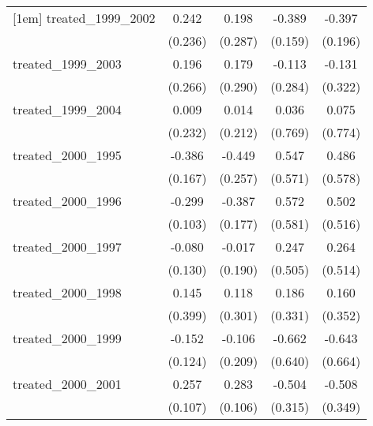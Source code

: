{\begin{tabular}{l*{4}{c}}
[1em]
treated\_1999\_2002&       0.242         &       0.198         &      -0.389\sym{*}  &      -0.397\sym{*}  \\
            &     (0.236)         &     (0.287)         &     (0.159)         &     (0.196)         \\
[1em]
treated\_1999\_2003&       0.196         &       0.179         &      -0.113         &      -0.131         \\
            &     (0.266)         &     (0.290)         &     (0.284)         &     (0.322)         \\
[1em]
treated\_1999\_2004&       0.009         &       0.014         &       0.036         &       0.075         \\
            &     (0.232)         &     (0.212)         &     (0.769)         &     (0.774)         \\
[1em]
treated\_2000\_1995&      -0.386\sym{*}  &      -0.449         &       0.547         &       0.486         \\
            &     (0.167)         &     (0.257)         &     (0.571)         &     (0.578)         \\
[1em]
treated\_2000\_1996&      -0.299\sym{**} &      -0.387\sym{*}  &       0.572         &       0.502         \\
            &     (0.103)         &     (0.177)         &     (0.581)         &     (0.516)         \\
[1em]
treated\_2000\_1997&      -0.080         &      -0.017         &       0.247         &       0.264         \\
            &     (0.130)         &     (0.190)         &     (0.505)         &     (0.514)         \\
[1em]
treated\_2000\_1998&       0.145         &       0.118         &       0.186         &       0.160         \\
            &     (0.399)         &     (0.301)         &     (0.331)         &     (0.352)         \\
[1em]
treated\_2000\_1999&      -0.152         &      -0.106         &      -0.662         &      -0.643         \\
            &     (0.124)         &     (0.209)         &     (0.640)         &     (0.664)         \\
[1em]
treated\_2000\_2001&       0.257\sym{*}  &       0.283\sym{**} &      -0.504         &      -0.508         \\
            &     (0.107)         &     (0.106)         &     (0.315)         &     (0.349)         \\

\end{tabular}}
